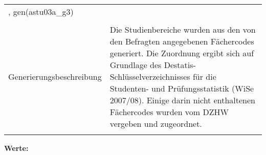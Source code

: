 \begin{tabular}{lL{11.3cm}}
, gen(astu03a\_g3) \\
				 \\
					Generierungsbeschreibung & Die Studienbereiche wurden aus den von den Befragten angegebenen Fächercodes generiert. Die Zuordnung ergibt sich auf Grundlage des Destatis-Schlüsselverzeichnisses für die Studenten- und Prüfungsstatistik (WiSe 2007/08).  Einige darin nicht enthaltenen Fächercodes wurden vom DZHW vergeben und zugeordnet. 
				 \\	
			 \\
		\end{tabular}






			\vspace*{1 cm}
			\noindent\textbf{Werte:}\\
